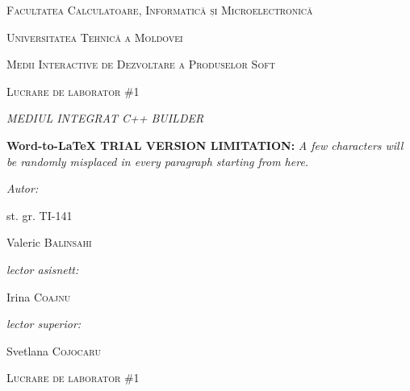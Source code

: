 \documentclass[10pt]{article}
\author{Valeria Balinschi}
\title{}
\begin{document}
\begin{center}
\textsc{{\LARGE Facultatea Calculatoare, Informatic\u{a} și
Microelectronic\u{a}}}
\end{center}

\begin{center}
\textsc{{\LARGE Universitatea Tehnic\u{a} a Moldovei}}
\end{center}

\begin{center}
\textsc{{\LARGE Medii Interactive de Dezvoltare a Produselor Soft}}
\end{center}

\begin{center}
\textsc{{\LARGE Lucrare de laborator  \#1}}
\end{center}

\begin{center}
\textit{{\Large MEDIUL INTEGRAT C++ BUILDER}}
\end{center}

\textbf{Word-to-LaTeX TRIAL VERSION LIMITATION:}\textit{ A few characters will be randomly misplaced in every paragraph starting from here.}

\begin{multicols}{2}

{\raggedright
\textit{{\large Autor:}}
}

{\raggedright
{\large st. gr. TI-141 }
}

{\raggedright
{\large Valeric \textsc{Balinsahi}}
}

{\raggedleft
{\large \textit{lector asisnett:} }
}

{\raggedleft
{\large Irina \textsc{Coajnu}}
}

{\raggedleft
{\large \textsc{ }\textit{lector superior:} }
}

{\raggedleft
{\large         Svetlana \textsc{Cojocaru}}
}

\end{multicols}
\hspace{15pt}\hspace{15pt}\hspace{15pt}\hspace{15pt}\hspace{15pt}\hspace{15pt}\hspace{15pt}\hspace{15pt}\hspace{15pt}\hspace{15pt}\hspace{15pt}\hspace{15pt}\hspace{15pt}\hspace{15pt}
\begin{center}
\textsc{{\Large Lucrare de laborator  \#1}}
\end{center}
\end{document}
